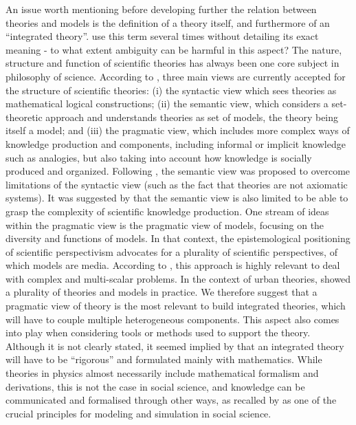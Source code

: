 \documentclass[10pt]{article}
\begin{document}
An issue worth mentioning before developing further the relation between theories and models is the definition of a theory itself, and furthermore of an ``integrated theory''. \citep{lobo2020urban} use this term several times without detailing its exact meaning - to what extent ambiguity can be harmful in this aspect? The nature, structure and function of scientific theories has always been one core subject in philosophy of science. According to \cite{winther2016structure}, three main views are currently accepted for the structure of scientific theories: (i) the syntactic view which sees theories as mathematical logical constructions; (ii) the semantic view, which considers a set-theoretic approach and understands theories as set of models, the theory being itself a model; and (iii) the pragmatic view, which includes more complex ways of knowledge production and components, including informal or implicit knowledge such as analogies, but also taking into account how knowledge is socially produced and organized. Following \cite{suppe2000understanding}, the semantic view was proposed to overcome limitations of the syntactic view (such as the fact that theories are not axiomatic systems). It was suggested by \citep{halvorson2012scientific} that the semantic view is also limited to be able to grasp the complexity of scientific knowledge production. One stream of ideas within the pragmatic view is the pragmatic view of models, focusing on the diversity and functions of models. In that context, the epistemological positioning of scientific perspectivism \citep{giere2010scientific} advocates for a plurality of scientific perspectives, of which models are media. According to \citep{callebaut2012scientific}, this approach is highly relevant to deal with complex and multi-scalar problems. In the context of urban theories, \citep{pumain2020conclusion} showed a plurality of theories and models in practice. We therefore suggest that a pragmatic view of theory is the most relevant to build integrated theories, which will have to couple multiple heterogeneous components. This aspect also comes into play when considering tools or methods used to support the theory. Although it is not clearly stated, it seemed implied by \citep{lobo2020urban} that an integrated theory will have to be ``rigorous'' and formulated mainly with mathematics. While theories in physics almost necessarily include mathematical formalism and derivations, this is not the case in social science, and knowledge can be communicated and formalised through other ways, as recalled by \cite{banos2013pour} as one of the crucial principles for modeling and simulation in social science.
\end{document}
